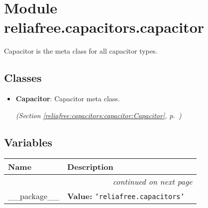 %
%
%


\section{Module reliafree.capacitors.capacitor}

    \label{reliafree:capacitors:capacitor}
Capacitor is the meta class for all capacitor types.



\subsection{Classes}

\begin{itemize}  \setlength{\parskip}{0ex}
  \item \textbf{Capacitor}: Capacitor meta class.



  \textit{(Section \ref{reliafree:capacitors:capacitor:Capacitor}, p.~\pageref{reliafree:capacitors:capacitor:Capacitor})}

\end{itemize}


  \subsection{Variables}

    \vspace{-1cm}
\hspace{\varindent}\begin{longtable}{|p{\varnamewidth}|p{\vardescrwidth}|l}
\cline{1-2}
\cline{1-2} \centering \textbf{Name} & \centering \textbf{Description}& \\
\cline{1-2}
\endhead\cline{1-2}\multicolumn{3}{r}{\small\textit{continued on next page}}\\\endfoot\cline{1-2}
\endlastfoot\raggedright \_\-\_\-p\-a\-c\-k\-a\-g\-e\-\_\-\_\- & \raggedright \textbf{Value:} 
{\tt \texttt{'}\texttt{reliafree.capacitors}\texttt{'}}&\\
\cline{1-2}
\end{longtable}

